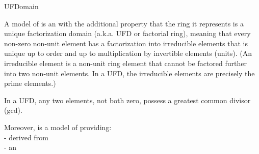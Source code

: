\begin{ccRefConcept}{UFDomain}


\ccDefinition


A model of  is an  with the additional property 
that the ring it represents is a unique factorization domain 
(a.k.a. UFD or factorial ring), meaning that every non-zero non-unit 
element has a factorization into irreducible elements that is unique 
up to order and up to multiplication by invertible elements (units). 
(An irreducible element is a non-unit ring element that cannot be factored 
further into two non-unit elements. In a UFD, the irreducible elements 
are precisely the prime elements.)

In a UFD, any two elements, not both zero, possess a greatest common 
divisor (gcd). 

Moreover,  is a model of 
 providing:\\
 
-  derived from  \\
-  an \\
  

 
\ccRefines
 
\ccSeeAlso

\\
\\
\\
\\
\\
\\
\\

\ccHasModels


\end{ccRefConcept}